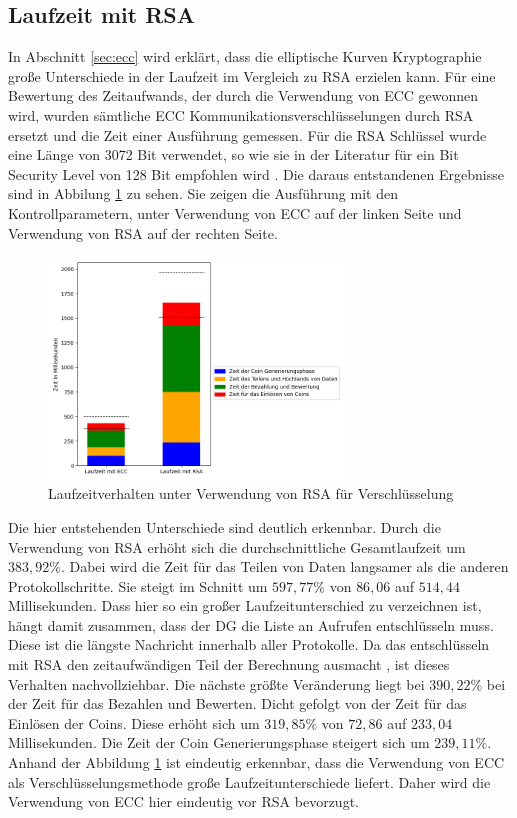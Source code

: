 \documentclass[
	fontsize=11pt,
	headings=small,
	parskip=half,           %
	bibliography=totoc,
	numbers=noenddot,       %
	open=any,               %
]{scrreprt}
\begin{document}
\subsection{Laufzeit mit RSA}
\label{subsec:runTimeRSA}
In Abschnitt \ref{sec:ecc} wird erklärt, dass die elliptische Kurven Kryptographie große Unterschiede in der Laufzeit im Vergleich zu RSA erzielen kann. Für eine Bewertung des Zeitaufwands, der durch die Verwendung von ECC gewonnen wird, wurden sämtliche ECC Kommunikationsverschlüsselungen durch RSA ersetzt und die Zeit einer Ausführung gemessen. Für die RSA Schlüssel wurde eine Länge von 3072 Bit verwendet, so wie sie in der Literatur für ein Bit Security Level von 128 Bit empfohlen wird \cite{elaine2016recommendation}. Die daraus entstandenen Ergebnisse sind in Abbilung \ref{fig:win_rsa} zu sehen. Sie zeigen die Ausführung mit den Kontrollparametern, unter Verwendung von ECC auf der linken Seite und Verwendung von RSA auf der rechten Seite. 

\begin{figure}[h]
    \caption{Laufzeitverhalten unter Verwendung von RSA für Verschlüsselung}
    \label{fig:win_rsa}
    \centering
    \includegraphics[width=0.7\textwidth]{figure_win_RSA_withOnlyOnes.png}
\end{figure}
Die hier entstehenden Unterschiede sind deutlich erkennbar. Durch die Verwendung von RSA erhöht sich die durchschnittliche Gesamtlaufzeit um $383,92\%$. Dabei wird die Zeit für das Teilen von Daten langsamer als die anderen Protokollschritte. Sie steigt im Schnitt um $597,77\%$ von $86,06$ auf $514,44$ Millisekunden. Dass hier so ein großer Laufzeitunterschied zu verzeichnen ist, hängt damit zusammen, dass der DG die Liste an Aufrufen entschlüsseln muss. Diese ist die längste Nachricht innerhalb aller Protokolle. Da das entschlüsseln mit RSA den zeitaufwändigen Teil der Berechnung ausmacht \cite{ecc-mahto2018performance}, ist dieses Verhalten nachvollziehbar. Die nächste größte Veränderung liegt bei $390,22\%$ bei der Zeit für das Bezahlen und Bewerten. Dicht gefolgt von der Zeit für das Einlösen der Coins. Diese erhöht sich um $319,85\%$ von $72,86$ auf $233,04$ Millisekunden. Die Zeit der Coin Generierungsphase steigert sich um $239,11\%$. Anhand der Abbildung \ref{fig:win_rsa} ist eindeutig erkennbar, dass die Verwendung von ECC als Verschlüsselungsmethode große Laufzeitunterschiede liefert. Daher wird die Verwendung von ECC hier eindeutig vor RSA bevorzugt.
\end{document}
